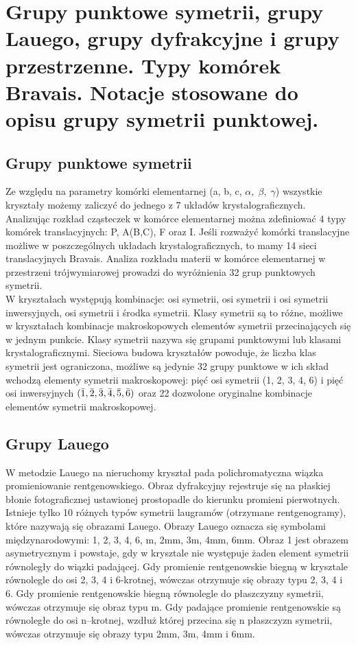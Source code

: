 \documentclass{article}
\begin{document}
\section{Grupy punktowe symetrii, grupy Lauego, grupy dyfrakcyjne i grupy przestrzenne. Typy komórek Bravais. Notacje stosowane do opisu grupy symetrii punktowej.}

\subsection{Grupy punktowe symetrii}

Ze względu na parametry komórki elementarnej (a, b, c, $\alpha,\; \beta, \; \gamma$) wszystkie kryształy możemy zaliczyć do jednego z 7 układów krystalograficznych. Analizując rozkład cząsteczek w komórce elementarnej można zdefiniować 4 typy komórek translacyjnych: P, A(B,C), F oraz I. Jeśli rozważyć komórki translacyjne możliwe w poszczególnych układach krystalograficznych, to mamy 14 sieci translacyjnych Bravais. Analiza rozkładu materii w komórce elementarnej w przestrzeni trójwymiarowej prowadzi do wyróżnienia 32 grup punktowych symetrii. \\

W kryształach występują kombinacje: osi symetrii, osi symetrii i osi symetrii inwersyjnych, osi symetrii i środka symetrii. Klasy symetrii są to różne, możliwe w kryształach kombinacje makroskopowych elementów symetrii przecinających się w jednym punkcie. Klasy symetrii nazywa się grupami punktowymi lub klasami krystalograficznymi. Sieciowa budowa kryształów powoduje, że liczba klas symetrii jest ograniczona, możliwe są jedynie 32 grupy punktowe w ich skład wchodzą
elementy symetrii makroskopowej: pięć osi symetrii (1, 2, 3, 4, 6) i pięć osi inwersyjnych $\mathrm{(\Bar{1}, \Bar{2}, \Bar{3}, \Bar{4}, \Bar{5}, \Bar{6})}$ oraz 22 dozwolone oryginalne kombinacje elementów symetrii makroskopowej. 

\subsection{Grupy Lauego}
W metodzie Lauego na nieruchomy kryształ pada polichromatyczna wiązka promieniowanie rentgenowskiego. Obraz dyfrakcyjny rejestruje się na płaskiej błonie fotograficznej ustawionej prostopadle do kierunku promieni pierwotnych. \\

Istnieje tylko 10 różnych typów symetrii laugramów (otrzymane rentgenogramy), które nazywają się obrazami Lauego. Obrazy Lauego oznacza się symbolami międzynarodowymi: 1, 2, 3, 4, 6, m, 2mm, 3m, 4mm, 6mm. Obraz 1 jest obrazem asymetrycznym i powstaje, gdy w krysztale nie występuje żaden element symetrii równoległy do wiązki padającej. Gdy promienie rentgenowskie biegną w krysztale równolegle do osi 2, 3, 4 i 6-krotnej, wówczas otrzymuje się obrazy typu 2, 3, 4 i 6. Gdy promienie rentgenowskie biegną równolegle do płaszczyzny symetrii, wówczas otrzymuje się obraz typu m. Gdy padające promienie rentgenowskie są równoległe do osi n–krotnej, wzdłuż której przecina się n płaszczyzn symetrii, wówczas otrzymuje się obrazy typu 2mm, 3m, 4mm i 6mm.
\end{document}
